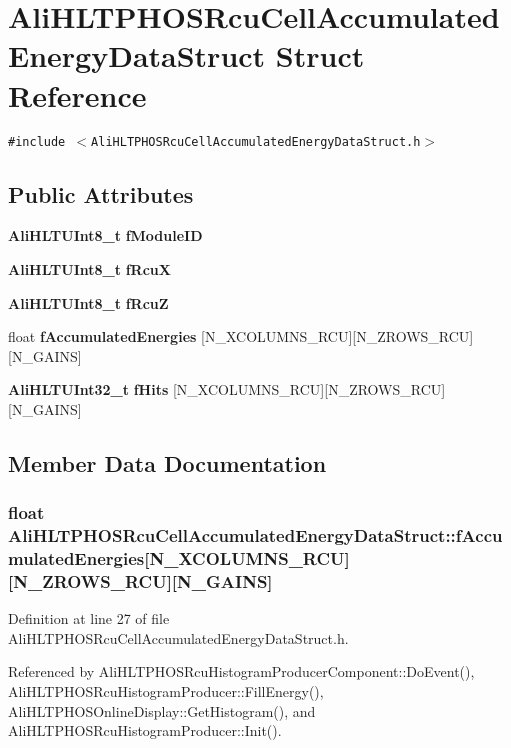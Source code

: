 \section{Ali\-HLTPHOSRcu\-Cell\-Accumulated\-Energy\-Data\-Struct Struct Reference}
\label{structAliHLTPHOSRcuCellAccumulatedEnergyDataStruct}
{\tt \#include $<$Ali\-HLTPHOSRcu\-Cell\-Accumulated\-Energy\-Data\-Struct.h$>$}

\subsection*{Public Attributes}
\begin{CompactItemize}
\item 
{\bf Ali\-HLTUInt8\_\-t} {\bf f\-Module\-ID}
\item 
{\bf Ali\-HLTUInt8\_\-t} {\bf f\-Rcu\-X}
\item 
{\bf Ali\-HLTUInt8\_\-t} {\bf f\-Rcu\-Z}
\item 
float {\bf f\-Accumulated\-Energies} [N\_\-XCOLUMNS\_\-RCU][N\_\-ZROWS\_\-RCU][N\_\-GAINS]
\item 
{\bf Ali\-HLTUInt32\_\-t} {\bf f\-Hits} [N\_\-XCOLUMNS\_\-RCU][N\_\-ZROWS\_\-RCU][N\_\-GAINS]
\end{CompactItemize}


\subsection{Member Data Documentation}
\subsubsection{\setlength{\rightskip}{0pt plus 5cm}float {\bf Ali\-HLTPHOSRcu\-Cell\-Accumulated\-Energy\-Data\-Struct::f\-Accumulated\-Energies}[N\_\-XCOLUMNS\_\-RCU][N\_\-ZROWS\_\-RCU][N\_\-GAINS]}\label{structAliHLTPHOSRcuCellAccumulatedEnergyDataStruct_o3}




Definition at line 27 of file Ali\-HLTPHOSRcu\-Cell\-Accumulated\-Energy\-Data\-Struct.h.

Referenced by Ali\-HLTPHOSRcu\-Histogram\-Producer\-Component::Do\-Event(), Ali\-HLTPHOSRcu\-Histogram\-Producer::Fill\-Energy(), Ali\-HLTPHOSOnline\-Display::Get\-Histogram(), and Ali\-HLTPHOSRcu\-Histogram\-Producer::Init().
